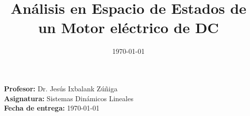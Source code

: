 \documentclass[iicol, pdflatex, sn-mathphys-num]{sn-jnl}
\title{An\'{a}lisis en Espacio de Estados de un Motor el\'{e}ctrico de DC}
\author{\fnm{Brandon} \sur{Marquez Salazar}}
\affil{Universidad de Guanajuato}
\date{\today}
\newcommand{\miprofesor}{Dr. Jes\'us Ixbalank Z\'u\~niga}
\newcommand{\micurso}{Sistemas Dinámicos Lineales}
\newcommand{\mifecha}{\today}
\begin{document}
  \maketitle
  \noindent
  \textbf{Profesor:} \miprofesor \\
  \textbf{Asignatura:} \micurso \\
  \textbf{Fecha de entrega:} \mifecha \\

  
  
  
  

  \newpage
  \nocite{*}
  
\end{document}
